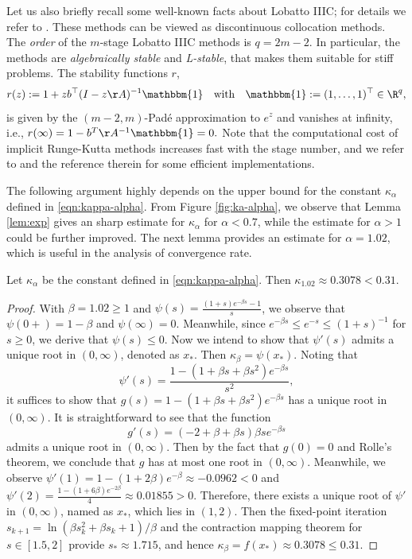 Let us also briefly recall some  well-known facts about Lobatto IIIC; for details we refer to \cite{HW}.
These methods can be viewed as discontinuous collocation methods.
The \textsl{order} of the $m$-stage Lobatto IIIC methods is
$q=2m-2$.
In particular, the methods are \textsl{algebraically stable} and
{\textsl{L-stable}}, that makes them suitable for stiff problems.
The stability functions $r$,
%
\[r(z):=1+z b^\top (I-z\AA)^{-1} \mathbbm{1}\quad\text{with}\quad  \mathbbm{1}:=(1,\dotsc,1)^\top\in \R^q,\]
%
is given by the $(m-2,m)$-Pad\'e
approximation to $e^z$ and
vanishes at infinity, i.e., $r(\infty)=1-b^T \AA^{-1} \mathbbm{1}=0.$
Note that the computational cost of implicit Runge-Kutta methods increases fast with the stage number, and we refer
to \cite{Butcher:1976, RK:1988, JN:1995} and the reference therein for some efficient implementations.

The following argument highly depends on the upper bound for the constant $\kappa_\alpha$
defined in \eqref{eqn:kappa-alpha}. From Figure \ref{fig:ka-alpha},
we observe that Lemma \ref{lem:exp} gives an sharp estimate
for $\kappa_\alpha$ for $\alpha<0.7$, while the estimate for $\alpha>1$ could be further improved. The next lemma provides an estimate for $\alpha=1.02$, which is useful in the analysis of convergence rate.

\begin{lemma}\label{lem:exp-102}
Let $\kappa_\alpha$ be the constant defined in \eqref{eqn:kappa-alpha}. Then $\kappa_{1.02} \approx 0.3078<0.31$.
\end{lemma}

\begin{proof}
With $\beta=1.02 \geq 1$ and $\psi(s) = \frac{(1+s)e^{-\beta s} - 1}{s}$,
we observe that
$\psi(0+) = 1-\beta$ and $\psi(\infty)= 0$.
Meanwhile, since $e^{-\beta s} \leq e^{-s} \leq (1+s)^{-1}$ for $s\ge0$,
we derive that $\psi(s) \leq 0$.
Now we intend to show that $\psi'(s)$ admits a unique root in $(0,\infty)$, denoted as $x_*$. Then $\kappa_{\beta} = \psi(x_*)$.
Noting that
$$\psi'(s) =
\frac{1-(1 + \beta s + \beta s^2)e^{-\beta s}}{s^2},$$
it suffices to show that
$g(s) = 1-(1 + \beta s + \beta s^2)e^{-\beta s}$ has a unique root in $(0,\infty)$.
It is straightforward to see that the function
$$g'(s) = (-2+\beta + \beta s)\beta s e^{-\beta s}$$
admits a unique root in $(0,\infty)$. Then by the fact that $g(0)=0$ and Rolle's theorem, we conclude that $g$ has at most one root in $(0,\infty)$.
Meanwhile, we observe $\psi'(1)=1-(1+2\beta)e^{-\beta} \approx -0.0962 <0$ and
$\psi'(2) = \frac{1-(1+6\beta)e^{-2\beta}}{4} \approx 0.01855 >0$.
Therefore, there exists a unique root of $\psi'$ in $(0, \infty)$, named as $x_*$,
which lies in $(1,2)$.
{Then the fixed-point iteration $s_{k+1} = \ln(\beta s_k^2+\beta s_k+1)/\beta$ and the contraction mapping theorem for $s\in[1.5,2]$ provide $s_*\approx 1.715$,
and hence $\kappa_\beta = f(x_*) \approx 0.3078 \le 0.31$.}
\end{proof}



